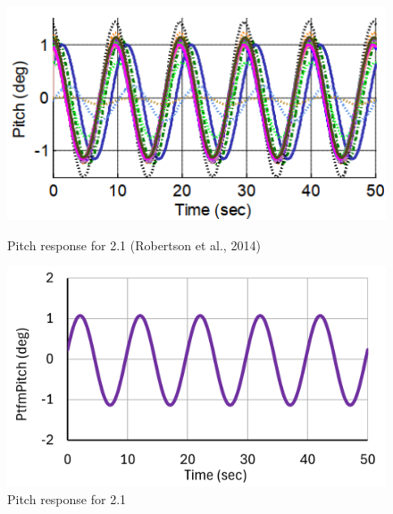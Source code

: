 \documentclass[a4paper]{article}
\begin{document}
\begin{figure}[H]
    \begin{minipage}{0.49\textwidth}
        \centering
        \includegraphics[width=1\textwidth]{2.1_pitch.png}
        \caption{\small Pitch response for 2.1 (Robertson et al., 2014)}
        \label{fig:2.1_pitch}
    \end{minipage}
    \hfill
    \begin{minipage}{0.5\textwidth}
        \centering
        \vspace{-0.6cm}
        \includegraphics[width=1\textwidth]{2.1_pitch_mine.png}
        \caption{\small Pitch response for 2.1}
        \label{fig:2.1_pitch_mine}
    \end{minipage}
\end{figure}
\end{document}
